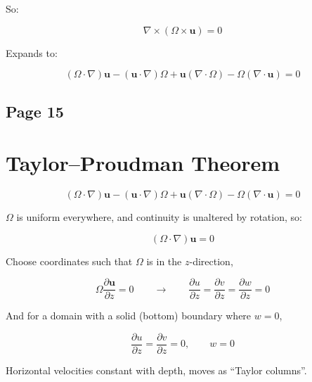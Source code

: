 \documentclass[11pt]{article}
\begin{document}
So:

\[
\nabla \times (\Omega \times \mathbf{u})=0
\]

Expands to:

\[
(\Omega\cdot\nabla)\mathbf{u}
-
(\mathbf{u}\cdot\nabla)\Omega
+
\mathbf{u}(\nabla\cdot\Omega)
-
\Omega(\nabla\cdot\mathbf{u})
=
0
\]

\subsection*{Page 15}
\section*{Taylor--Proudman Theorem}

\[
(\Omega\cdot\nabla)\mathbf{u}
-
(\mathbf{u}\cdot\nabla)\Omega
+
\mathbf{u}(\nabla\cdot\Omega)
-
\Omega(\nabla\cdot\mathbf{u})
=
0
\]

$\Omega$ is uniform everywhere, and continuity is unaltered by rotation, so:

\[
(\Omega\cdot\nabla)\mathbf{u}=0
\]

Choose coordinates such that $\Omega$ is in the $z$-direction,

\[
\Omega \frac{\partial \mathbf{u}}{\partial z}=0
\qquad\to\qquad
\frac{\partial u}{\partial z}
=
\frac{\partial v}{\partial z}
=
\frac{\partial w}{\partial z}
=
0
\]

And for a domain with a solid (bottom) boundary where $w=0$,

\[
\frac{\partial u}{\partial z}
=
\frac{\partial v}{\partial z}
=
0,
\qquad
w=0
\]

Horizontal velocities constant with depth, moves as ``Taylor columns''.
\end{document}
